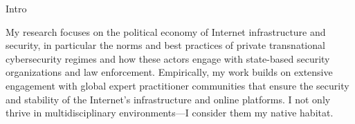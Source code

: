 


Intro


My research focuses on the political economy of Internet infrastructure and security, in particular the norms and best practices of private transnational cybersecurity regimes and how these actors engage with state-based security organizations and law enforcement.
%
%
Empirically, my work builds on extensive engagement with global expert practitioner communities that ensure the security and stability of the Internet's infrastructure and online platforms.
%
%
%
I not only thrive in multidisciplinary environments---I consider them my native habitat.




